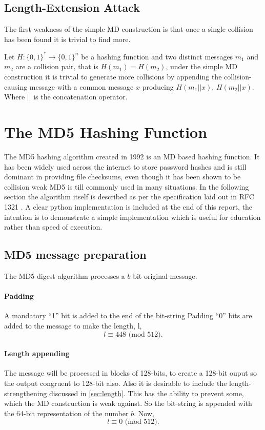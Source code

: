 \documentclass[a4paper,12pt]{article}
\begin{document}
\subsection{Length-Extension Attack}
The first weakness of the simple MD construction is that once a single collision has been found it is trivial to find more\cite{Sasaki2006}. 

Let $H: \{0,1\}^* \rightarrow \{0,1\}^n$ be a hashing function and two distinct messages $m_1$ and $m_2$ are a collision pair, that is $H(m_1) = H(m_2)$, under the simple MD construction it is trivial to generate more collisions by appending the collision-causing message with a common message $x$ producing $H(m_1||x)$, $H(m_2||x)$.  Where $||$ is the concatenation operator.



\label{sec:length}

\section{The MD5 Hashing Function}
The MD5 hashing algorithm\cite{Rivest} created in 1992 is an MD based hashing function. It has been widely used across the internet to store password hashes and is still dominant in providing file checksums, even though it has been shown to be collision weak MD5 is till commonly used in many situations. In the following section the algorithm itself is described as per the specification laid out in RFC 1321 \cite{Rivest}. A clear python implementation is included at the end of this report, the intention is to demonstrate a simple implementation which is useful for education rather than speed of execution.

\subsection{MD5 message preparation}
The MD5 digest algorithm processes a $b$-bit original message.
\paragraph{Padding}
\label{sec:md5pad}
A mandatory ``1'' bit is added to the end of the bit-string 
Padding ``0'' bits are added to the message to make the length, l, $$l \equiv 448 \text{ (mod } 512).$$

\paragraph{Length appending}
The message will be processed in blocks of 128-bits, to create a 128-bit ouput so the output congruent to 128-bit also. Also it is desirable to include the length-strengthening discussed in \ref{sec:length}. This has the ability to prevent some, which the MD construction is weak against. So the bit-string is appended with the 64-bit representation of the number $b$. Now, $$l \equiv 0 \text{ (mod } 512).$$
\end{document}
